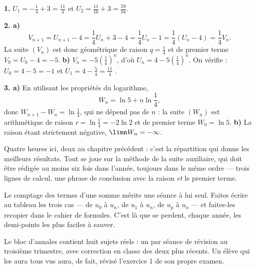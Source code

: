 \begin{corrige}
\textbf{1.} $U_{1} = -\frac14+3 = \frac{11}{4}$ et
$U_{2} = \frac{11}{16}+3 = \frac{59}{16}$.

\textbf{2. a)}
\[
  V_{n+1} = U_{n+1}-4 = \frac14U_{n}+3-4 = \frac14U_{n}-1
  = \frac14\left(U_{n}-4\right) = \frac14 V_{n} .
\]
La suite $\left(V_{n}\right)$ est donc géométrique de raison $q = \frac14$
et de premier terme $V_{0} = U_{0}-4 = -5$.
\textbf{b)} $V_{n} = -5\left(\frac14\right)^{n}$, d'où
$U_{n} = 4-5\left(\frac14\right)^{n}$. On vérifie : $U_{0} = 4-5 = -1$
\checkmark et $U_{1} = 4-\frac54 = \frac{11}{4}$ \checkmark.

\textbf{3. a)} En utilisant les propriétés du logarithme,
\[
  W_{n} = \ln 5+n\ln\frac14,
\]
donc $W_{n+1}-W_{n} = \ln\frac14$, qui ne dépend pas de $n$ : la suite
$\left(W_{n}\right)$ est arithmétique de raison $r = \ln\frac14 = -2\ln2$ et
de premier terme $W_{0} = \ln 5$.
\textbf{b)} La raison étant strictement négative,
$\limn W_{n} = -\infty$.
\end{corrige}

\begin{notepourlaclasse}
Quatre heures ici, deux au chapitre précédent : c'est la répartition qui
donne les meilleurs résultats. Tout se joue sur la méthode de la suite
auxiliaire, qui doit être rédigée au moins six fois dans l'année, toujours
dans le même ordre — trois lignes de calcul, une phrase de conclusion avec
la raison \emph{et} le premier terme.

Le comptage des termes d'une somme mérite une séance à lui seul. Faites
écrire au tableau les trois cas — de $u_{0}$ à $u_{n}$, de $u_{1}$ à
$u_{n}$, de $u_{p}$ à $u_{n}$ — et faites-les recopier dans le cahier de
formules. C'est là que se perdent, chaque année, les demi-points les plus
faciles à sauver.

Le bloc d'annales contient huit sujets réels : un par séance de révision au
troisième trimestre, avec correction en classe des deux plus récents. Un
élève qui les aura tous vus aura, de fait, révisé l'exercice 1 de son propre
examen.
\end{notepourlaclasse}
